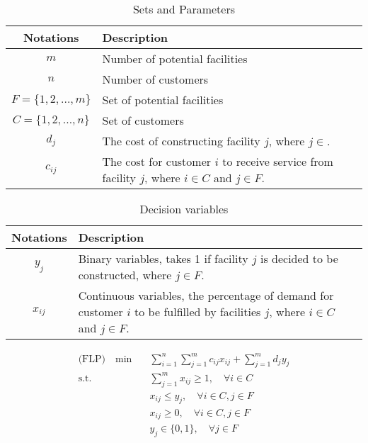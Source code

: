             \begin{table}[!htp]
                \centering
                \caption{Sets and Parameters}
                \begin{tabular}{c|p{8cm}}
                    \hline
                    \textbf{Notations} & \textbf{Description} \\
                    \hline
                    $m$ & Number of potential facilities\\
                    $n$ & Number of customers\\
                    $F = \{1, 2, \ldots, m\}$ & Set of potential facilities \\
                    $C = \{1, 2, \ldots, n\}$ & Set of customers\\
                    $d_j$ & The cost of constructing facility $j$, where $j \in $.\\
                    $c_{ij}$& The cost for customer $i$ to receive service from facility $j$, where $i \in C$ and $j \in F$.\\
                    \hline
                \end{tabular}
            \end{table}

            \begin{table}[!htp]
                \centering
                \caption{Decision variables}
                \begin{tabular}{c|p{8cm}}
                    \hline
                    \textbf{Notations} & \textbf{Description}\\
                    \hline
                    $y_j$ & Binary variables, takes 1 if facility $j$ is decided to be constructed, where $j \in F$.\\
                    $x_{ij}$ & Continuous variables, the percentage of demand for customer $i$ to be fulfilled by facilities $j$, where $i \in C$ and $j \in F$.\\
                    \hline
                \end{tabular}
            \end{table}

            \begin{align}
                \text{(FLP)} \quad \min \quad & \sum_{i = 1}^n \sum_{j = 1}^m c_{ij} x_{ij} + \sum_{j = 1}^m d_j y_j \nonumber\\
                \text{s.t.} \quad &\sum_{j = 1}^m x_{ij} \ge 1, \quad \forall i \in C \label{cons:demand}\\
                    &x_{ij} \le y_j, \quad \forall i \in C, j \in F \label{cons:open}\\
                    &x_{ij} \ge 0, \quad \forall i \in C, j \in F \label{cons:nonnegX}\\
                    &y_{j} \in \{0, 1\}, \quad \forall j \in F \label{cons:nonnegY}
            \end{align}

